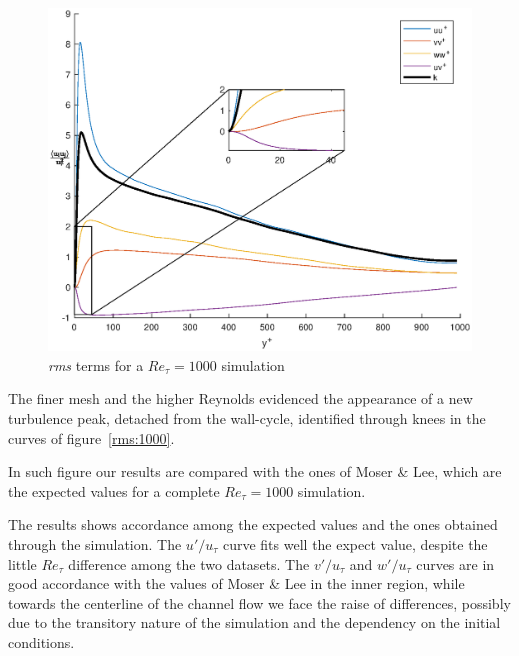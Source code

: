 \begin{figure}
\begin{center}
\includegraphics[scale=0.55]{grafici/budget+k_1000.eps}
\caption{\emph{rms} terms for a $Re_{\tau}=1000$ simulation}
\label{budget:1000}
\end{center} 
\end{figure}


The finer mesh and the higher Reynolds evidenced the appearance of a new turbulence peak, detached from the wall-cycle, identified through knees in the curves of figure~\ref{rms:1000}. \par
In such figure our results are compared with the ones of Moser \& Lee, which are the expected values for a complete $Re_{\tau}=1000$ simulation. \par
The results shows accordance among the expected values and the ones obtained through the simulation.
The $u'/u_{\tau}$ curve fits well the expect value, despite the little $Re_{\tau}$ difference among the two datasets.
The $v'/u_{\tau}$ and $w'/u_{\tau}$ curves are in good accordance with the values of Moser \& Lee in the inner region, while towards the centerline of the channel flow we face the raise of differences, possibly due to the transitory nature of the simulation and the dependency on the initial conditions.\\~\par


